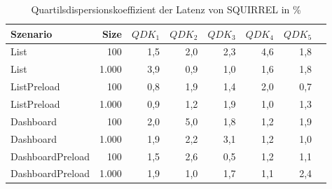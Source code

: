 
\begin{table}[ht]
\setlength{\extrarowheight}{-1pt}
\centering
\caption{Quartilsdispersionskoeffizient der Latenz von SQUIRREL in \%}
\begin{tabular}{lrrrrrrr}
\toprule
Szenario & Size & ${QDK_1}$ & ${QDK_2}$ & ${QDK_3}$& ${QDK_4}$ & ${QDK_5}$ \\
\midrule
	List & 100 & \cellcolor{red!2}  1,5 & \cellcolor{red!2}  2,0 & \cellcolor{red!3}  2,3 & \cellcolor{red!5}  4,6 & \cellcolor{red!2}  1,8 \\
	List & 1.000 & \cellcolor{red!4}  3,9 & \cellcolor{red!1}  0,9 & \cellcolor{red!2}  1,0 & \cellcolor{red!2}  1,6 & \cellcolor{red!2}  1,8 \\
	ListPreload & 100 & \cellcolor{red!1}  0,8 & \cellcolor{red!2}  1,9 & \cellcolor{red!2}  1,4 & \cellcolor{red!2}  2,0 & \cellcolor{red!1}  0,7 \\
	ListPreload & 1.000 & \cellcolor{red!1}  0,9 & \cellcolor{red!2}  1,2 & \cellcolor{red!2}  1,9 & \cellcolor{red!1}  1,0 & \cellcolor{red!2}  1,3 \\
	Dashboard & 100 & \cellcolor{red!3}  2,0 & \cellcolor{red!5}  5,0 & \cellcolor{red!2}  1,8 & \cellcolor{red!2}  1,2 & \cellcolor{red!2}  1,9 \\
	Dashboard & 1.000 & \cellcolor{red!2}  1,9 & \cellcolor{red!3}  2,2 & \cellcolor{red!4}  3,1 & \cellcolor{red!2}  1,2 & \cellcolor{red!2}  1,0 \\
	DashboardPreload & 100 & \cellcolor{red!2}  1,5 & \cellcolor{red!3}  2,6 & \cellcolor{red!1}  0,5 & \cellcolor{red!2}  1,2 & \cellcolor{red!2}  1,1 \\
	DashboardPreload & 1.000 & \cellcolor{red!2}  1,9 & \cellcolor{red!2}  1,0 & \cellcolor{red!2}  1,7 & \cellcolor{red!2}  1,1 & \cellcolor{red!3}  2,4 \\
\bottomrule
\end{tabular}
\label{tab:quartilsdispersionskoeffizient_latenz_squirrel}
\end{table}
	